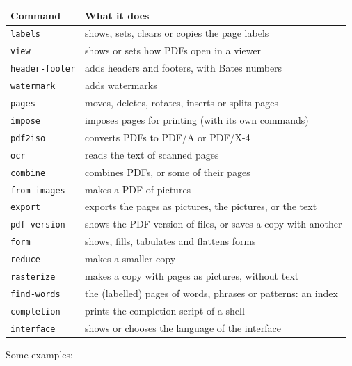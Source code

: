\documentclass[12pt,
              article,
              oneside
              ]{memoir}
\begin{document}
%
\begin{longtable}{@{}lp{}@{}}
\toprule
Command & What it does\\
\midrule
\endhead
\texttt{labels} & shows, sets, clears or copies the page labels\\
\texttt{view} & shows or sets how PDFs open in a viewer\\
\texttt{header-footer} & adds headers and footers, with Bates numbers\\
\texttt{watermark} & adds watermarks\\
\texttt{pages} & moves, deletes, rotates, inserts or splits pages\\
\texttt{impose} & imposes pages for printing (with its own commands)\\
\texttt{pdf2iso} & converts PDFs to PDF/A or PDF/X-4\\
\texttt{ocr} & reads the text of scanned pages\\
\texttt{combine} & combines PDFs, or some of their pages\\
\texttt{from-images} & makes a PDF of pictures\\
\texttt{export} & exports the pages as pictures, the pictures, or the text\\
\texttt{pdf-version} & shows the PDF version of files, or saves a copy with another\\
\texttt{form} & shows, fills, tabulates and flattens forms\\
\texttt{reduce} & makes a smaller copy\\
\texttt{rasterize} & makes a copy with pages as pictures, without text\\
\texttt{find-words} & the (labelled) pages of words, phrases or patterns: an index\\
\texttt{completion} & prints the completion script of a shell\\
\texttt{interface} & shows or chooses the language of the interface\\
\bottomrule
\end{longtable}

\noindent Some examples:
\end{document}
